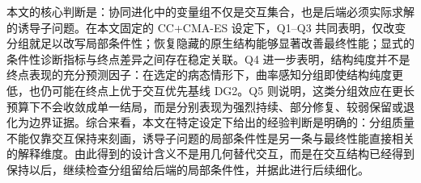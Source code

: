 本文的核心判断是：协同进化中的变量组不仅是交互集合，也是后端必须实际求解的诱导子问题。在本文固定的 CC+CMA-ES 设定下，Q1--Q3 共同表明，仅改变分组就足以改写局部条件性；恢复隐藏的原生结构能够显著改善最终性能；显式的条件性诊断指标与终点差异之间存在稳定关联。Q4 进一步表明，结构纯度并不是终点表现的充分预测因子：在选定的病态情形下，曲率感知分组即使结构纯度更低，也仍可能在终点上优于交互优先基线 DG2。Q5 则说明，这类分组效应在更长预算下不会收敛成单一结局，而是分别表现为强烈持续、部分修复、较弱保留或退化为边界证据。综合来看，本文在特定设定下给出的经验判断是明确的：分组质量不能仅靠交互保持来刻画，诱导子问题的局部条件性是另一条与最终性能直接相关的解释维度。由此得到的设计含义不是用几何替代交互，而是在交互结构已经得到保持以后，继续检查分组留给后端的局部条件性，并据此进行后续细化。
